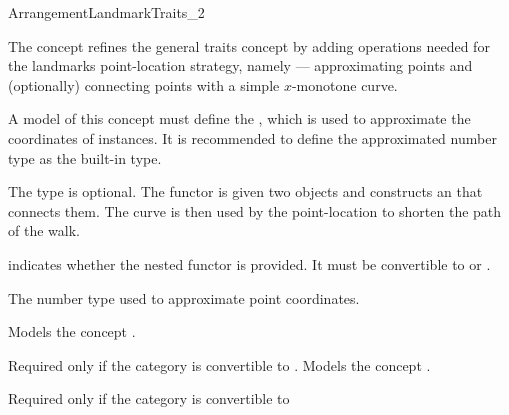 
\ccRefPageBegin
\begin{ccRefConcept}{ArrangementLandmarkTraits_2}

\ccDefinition
The concept \ccRefName{} refines the general traits concept by adding
operations needed for the landmarks point-location strategy, namely ---
approximating points and (optionally) connecting points with a simple
$x$-monotone curve.

A model of this concept must define the , which
is used to approximate the coordinates of  instances. It is
recommended to define the approximated number type as the built-in
 type. 

The type  is optional. The functor
is given two  objects and constructs
an  that connects them. The curve is then
used by the point-location to shorten the path of the walk.

\ccRefines
{}

\ccTypes
  {indicates whether the nested functor  is
  provided. It must be convertible to  or .} 

%
  {The number type used to approximate point coordinates.}

\ccThreeToTwo
{}%
  {Models the concept .}

%
  {Required only if the  category is convertible to
  .
  Models the concept .}


 {}
\ccGlue
{}
          {Required only if
          the  category
          is convertible to~}


\end{ccRefConcept}
